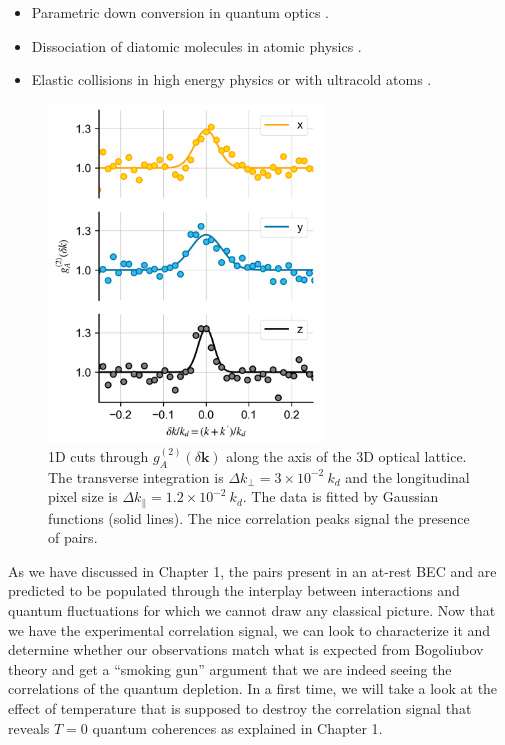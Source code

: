\begin{itemize}
    \item Parametric down conversion in quantum optics \cite{burnham1970}.
    \item Dissociation of diatomic molecules in atomic physics \cite{greiner2005}.
    \item Elastic collisions in high energy physics \cite{arnison1982} or with ultracold atoms \cite{perrin2007observation}.
\end{itemize}

\begin{figure}
    \centering
    \includegraphics[width=0.65\textwidth]{Fig/Chapter4/1d_cuts.png}
    \caption{1D cuts through $g_{A}^{(2)} (\delta {\bm k})$ along the axis of the 3D optical lattice. The transverse integration is $\Delta k_{\perp}=3 \times 10^{-2} \ k_d$ and the longitudinal pixel size is $\Delta k_{\parallel}=1.2 \times 10^{-2} \ k_d$. The data is fitted by Gaussian functions (solid lines). The nice correlation peaks signal the presence of \kmk pairs.}
    \label{fig:kmk_signal}
\end{figure}

\noindent As we have discussed in Chapter 1, the \kmk pairs present in an at-rest BEC and are predicted to be populated through the interplay between interactions and quantum fluctuations for which we cannot draw any classical picture. Now that we have the experimental \kmk correlation signal, we can look to characterize it and determine whether our observations match what is expected from Bogoliubov theory and get a ``smoking gun'' argument that we are indeed seeing the \kmk correlations of the quantum depletion. In a first time, we will take a look at the effect of temperature that is supposed to destroy the \kmk correlation signal that reveals $T=0$ quantum coherences as explained in Chapter 1.

